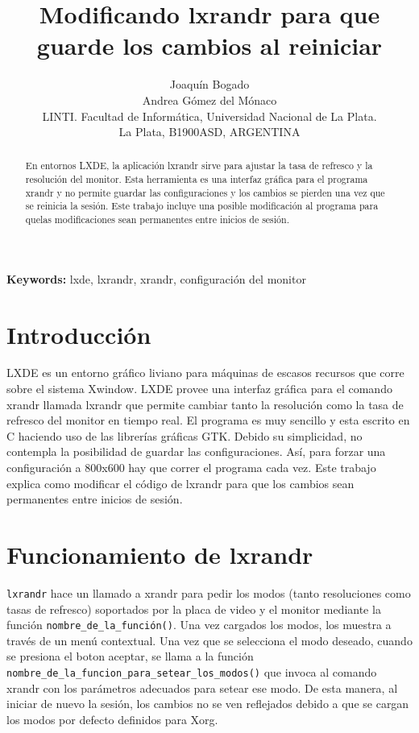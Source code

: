 \documentclass[final,narroweqnarray,inline,twoside]{ieee}
\author{Joaquín Bogado\\ Andrea Gómez del Mónaco
\\LINTI. Facultad de Informática, Universidad Nacional de La Plata.
\\La Plata, B1900ASD, ARGENTINA
}
\title{Modificando lxrandr para que guarde los cambios al reiniciar}
\begin{document}
\maketitle
\sloppy

\begin{abstract}
En entornos LXDE, la aplicación lxrandr sirve para ajustar la tasa de refresco y la resolución del monitor. Esta herramienta
es una interfaz gráfica para el programa xrandr y no permite guardar las configuraciones y los cambios se pierden una vez
que se reinicia la sesión. Este trabajo incluye una posible modificación al programa para quelas modificaciones sean
permanentes entre inicios de sesión.
\end{abstract}

\noindent \textbf{Keywords: } lxde, lxrandr, xrandr, configuración del monitor

\section{Introducción}
LXDE es un entorno gráfico liviano para máquinas de escasos recursos que corre sobre el sistema Xwindow. LXDE provee una
interfaz gráfica para el comando xrandr llamada lxrandr que permite cambiar tanto la resolución como la tasa de refresco del
monitor en tiempo real. El programa es muy sencillo y esta escrito en C haciendo uso de las librerías gráficas GTK. Debido
su simplicidad, no contempla la posibilidad de guardar las configuraciones. Así, para forzar una configuración a 800x600 hay
que correr el programa cada vez. Este trabajo explica como modificar el código de lxrandr para que los cambios sean
permanentes entre inicios de sesión. 

\section{Funcionamiento de lxrandr}
\texttt{lxrandr} hace un llamado a xrandr para pedir los modos (tanto resoluciones como tasas de refresco) soportados por la
placa de video y el monitor mediante la función \texttt{nombre\_de\_la\_función()}. Una vez cargados los modos, los muestra
a través de un menú contextual. Una vez que se selecciona el modo deseado, cuando se presiona el boton aceptar, se llama a
la función \texttt{nombre\_de\_la\_funcion\_para\_setear\_los\_modos()} que invoca al comando xrandr con los parámetros
adecuados para setear ese modo. De esta manera, al iniciar de nuevo la sesión, los cambios no se ven reflejados debido a que
se cargan los modos por defecto definidos para Xorg.
\end{document}
